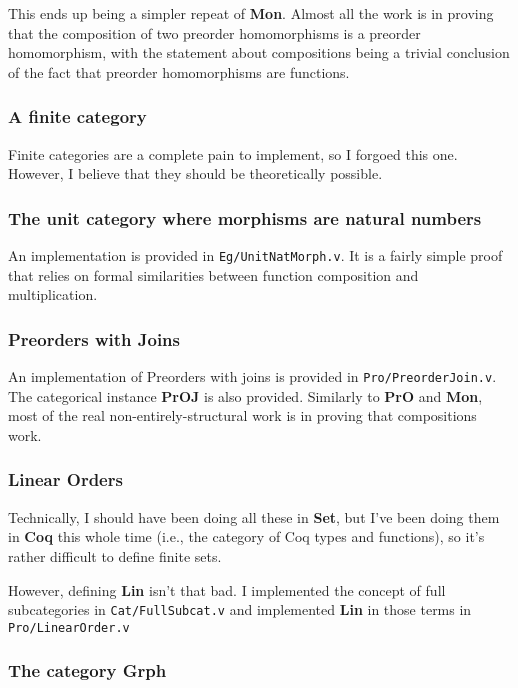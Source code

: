 \documentclass[12pt,twocolumn,oneside]{book}
\begin{document}
This ends up being a simpler repeat of \textbf{Mon}. Almost all the work is in
proving that the composition of two preorder homomorphisms is a preorder
homomorphism, with the statement about compositions being a trivial conclusion of
the fact that preorder homomorphisms are functions.

\subsubsection{A finite category}

Finite categories are a complete pain to implement, so I forgoed this one. However,
I believe that they should be theoretically possible.

\subsubsection{The unit category where morphisms are natural numbers}

An implementation is provided in \texttt{Eg/UnitNatMorph.v}. It is a fairly simple
proof that relies on formal similarities between function composition and multiplication.

\subsubsection{Preorders with Joins}

An implementation of Preorders with joins is provided in \texttt{Pro/PreorderJoin.v}.
The categorical instance \textbf{PrOJ} is also provided. Similarly to \textbf{PrO}
and \textbf{Mon}, most of the real non-entirely-structural work is in proving that
compositions work.

\subsubsection{Linear Orders}

Technically, I should have been doing all these in \textbf{Set}, but I've been
doing them in \textbf{Coq} this whole time (i.e., the category of Coq
types and functions), so it's rather difficult to define finite sets.

However, defining \textbf{Lin} isn't that bad. I implemented the concept of full
subcategories in \texttt{Cat/FullSubcat.v} and implemented \textbf{Lin} in those terms
in \texttt{Pro/LinearOrder.v}

\subsubsection{The category \textbf{Grph}}
\end{document}

